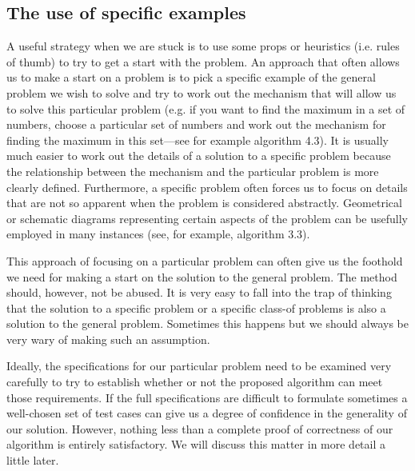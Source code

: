 \documentclass{book}
\begin{document}
\subsection{The use of specific examples}
A useful strategy when we are stuck is to use some props or heuristics (i.e. rules of thumb) to try to get a start with the problem. An approach that often allows us to make a start on a problem is to pick a specific example of the general problem we wish to solve and try to work out the mechanism that will allow us to solve this particular problem (e.g. if you want to find the maximum in a set of numbers, choose a particular set of numbers and work out the mechanism for finding the maximum in this set—see for example algorithm 4.3). It is usually much easier to work out the details of a solution to a specific problem because the relationship between the mechanism and the particular problem is more clearly defined. Furthermore, a specific problem often forces us to focus on details that are not so apparent when the problem is considered abstractly. Geometrical or schematic diagrams representing certain aspects of the problem can be usefully employed in many instances (see, for example, algorithm 3.3).\par
	This approach of focusing on a particular problem can often give us the foothold we need for making a start on the solution to the general problem. The method should, however, not be abused. It is very easy to fall into the trap of thinking that the solution to a specific problem or a specific class-of problems is also a solution to the general problem. Sometimes this happens but we should always be very wary of making such an assumption.\par
	Ideally, the specifications for our particular problem need to be examined very carefully to try to establish whether or not the proposed algorithm can meet those requirements. If the full specifications are difficult to formulate sometimes a well-chosen set of test cases can give us a degree of confidence in the generality of our solution. However, nothing less than a complete proof of correctness of our algorithm is entirely satisfactory. We will discuss this matter in more detail a little later.
\end{document}
